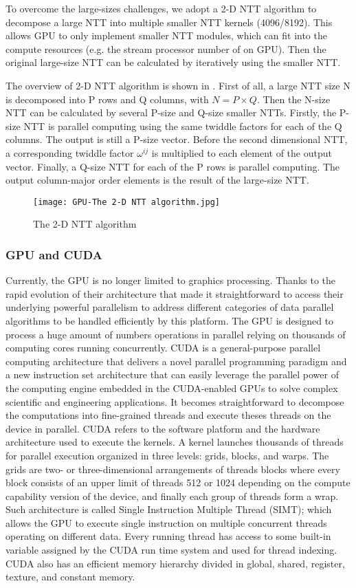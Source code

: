 To overcome the large-sizes challenges, we adopt a 2-D NTT algorithm to decompose a large NTT into multiple smaller NTT kernels (4096/8192). This allows GPU to only implement smaller NTT modules, which can fit into the compute resources (e.g. the stream processor number of on GPU). Then the original large-size NTT can be calculated by iteratively using the smaller NTT.

The overview of 2-D NTT algorithm is shown in . First of all, a large NTT size N is decomposed into P rows and Q columns, with $N=P \times Q$. Then the N-size NTT can be calculated by several P-size and Q-size smaller NTTs. Firstly, the P-size NTT is parallel computing using the same twiddle factors for each of the Q columns. The output is still a P-size vector. Before the second dimensional NTT, a corresponding twiddle factor $\omega^{ij}$ is multiplied to each element of the output vector. Finally, a Q-size NTT for each of the P rows is parallel computing. The output column-major order elements is the result of the large-size NTT.
\begin{figure}[!ht]
    \centering
    \texttt{[image: GPU-The 2-D NTT algorithm.jpg]}
    \caption{The 2-D NTT algorithm}
    \label{fig:The 2-D NTT Algorithm}
\end{figure}
\subsubsection{GPU and CUDA}
Currently, the GPU is no longer limited to graphics processing. Thanks to the rapid evolution of their architecture that made it straightforward to access their underlying powerful  parallelism to address different categories of data parallel algorithms to be handled efficiently by this platform. The GPU is designed to process a huge amount of numbers operations in parallel relying on thousands of computing cores running concurrently. CUDA is a general-purpose parallel computing architecture that delivers a novel parallel programming paradigm and a new instruction set architecture that can easily leverage the parallel power of the computing engine embedded in the CUDA-enabled GPUs to solve complex scientific and engineering applications. It becomes straightforward to decompose the computations into fine-grained threads and execute theses threads on the device in parallel. CUDA refers to the software platform and the hardware architecture used to execute the kernels. A kernel launches thousands of threads for parallel execution organized in three levels: grids, blocks, and warps. The grids are two- or three-dimensional arrangements of threads blocks where every block consists of an upper limit of threads 512 or 1024 depending on the compute capability version of the device, and finally each group of threads form a wrap. Such architecture is called Single Instruction Multiple Thread (SIMT); which allows the GPU to execute single instruction on multiple concurrent threads operating on different data. Every running thread has access to some built-in variable assigned by the CUDA run time system and used for thread indexing. CUDA also has an efficient memory hierarchy divided in global, shared, register, texture, and constant memory.
